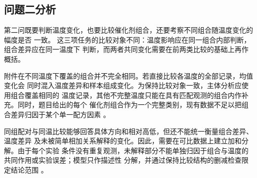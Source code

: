 \subsection{问题二分析}

第二问既要判断温度变化，也要比较催化剂组合，还要考察不同组合随温度变化的幅度是否
一致。
这三项任务的比较对象不同：温度影响应在同一组合内部判断，组合差异应在同一温度下
判断，而两者共同变化需要在前两类比较的基础上再作概括。

附件在不同温度下覆盖的组合并不完全相同。若直接比较各温度的全部记录，均值变化会
同时混入温度差异和样本组成变化。为保持比较对象一致，主体分析应使用组合覆盖相同的
温度记录，其他不完整温度只能在具有匹配观测的组合内作补充。同时，题目给出的每个
催化剂组合作为一个完整类别，现有数据不足以把组合差异归因于某个单一配方因素
\cite{searle1980}。

同组配对与同温比较能够回答具体方向和相对高低，但还不能统一衡量组合差异、温度差异
及未被简单相加关系解释的变化。因此，需要在可比数据上建立加和分解。由于每个实验
条件没有重复观测，未解释部分不能单独归因于组合与温度的共同作用或实验误差；模型只作描述性
分解，并通过保持比较结构的删减检查限定结论范围
\cite{nisttwoway,graphpadnorep}。
